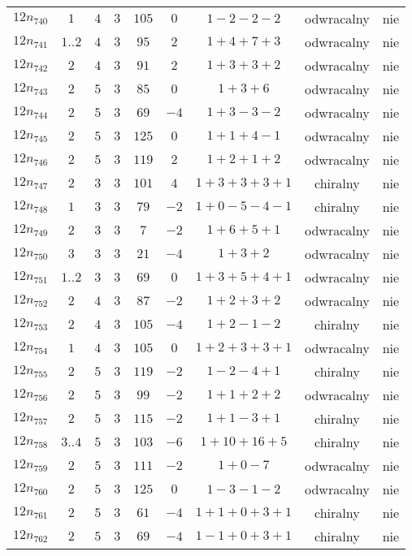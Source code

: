 \begin{longtable}{ccccccccc}
$12n_{740}$ & $1$ & $4$ & $3$ & $105$ & $0$ & $1-2-2-2$ & odwracalny & nie \\
$12n_{741}$ & $1..2$ & $4$ & $3$ & $95$ & $2$ & $1+4+7+3$ & odwracalny & nie \\
$12n_{742}$ & $2$ & $4$ & $3$ & $91$ & $2$ & $1+3+3+2$ & odwracalny & nie \\
$12n_{743}$ & $2$ & $5$ & $3$ & $85$ & $0$ & $1+3+6$ & odwracalny & nie \\
$12n_{744}$ & $2$ & $5$ & $3$ & $69$ & $-4$ & $1+3-3-2$ & odwracalny & nie \\
$12n_{745}$ & $2$ & $5$ & $3$ & $125$ & $0$ & $1+1+4-1$ & odwracalny & nie \\
$12n_{746}$ & $2$ & $5$ & $3$ & $119$ & $2$ & $1+2+1+2$ & odwracalny & nie \\
$12n_{747}$ & $2$ & $3$ & $3$ & $101$ & $4$ & $1+3+3+3+1$ & chiralny & nie \\
$12n_{748}$ & $1$ & $3$ & $3$ & $79$ & $-2$ & $1+0-5-4-1$ & chiralny & nie \\
$12n_{749}$ & $2$ & $3$ & $3$ & $7$ & $-2$ & $1+6+5+1$ & odwracalny & nie \\
$12n_{750}$ & $3$ & $3$ & $3$ & $21$ & $-4$ & $1+3+2$ & odwracalny & nie \\
$12n_{751}$ & $1..2$ & $3$ & $3$ & $69$ & $0$ & $1+3+5+4+1$ & odwracalny & nie \\
$12n_{752}$ & $2$ & $4$ & $3$ & $87$ & $-2$ & $1+2+3+2$ & odwracalny & nie \\
$12n_{753}$ & $2$ & $4$ & $3$ & $105$ & $-4$ & $1+2-1-2$ & chiralny & nie \\
$12n_{754}$ & $1$ & $4$ & $3$ & $105$ & $0$ & $1+2+3+3+1$ & odwracalny & nie \\
$12n_{755}$ & $2$ & $5$ & $3$ & $119$ & $-2$ & $1-2-4+1$ & chiralny & nie \\
$12n_{756}$ & $2$ & $5$ & $3$ & $99$ & $-2$ & $1+1+2+2$ & odwracalny & nie \\
$12n_{757}$ & $2$ & $5$ & $3$ & $115$ & $-2$ & $1+1-3+1$ & chiralny & nie \\
$12n_{758}$ & $3..4$ & $5$ & $3$ & $103$ & $-6$ & $1+10+16+5$ & chiralny & nie \\
$12n_{759}$ & $2$ & $5$ & $3$ & $111$ & $-2$ & $1+0-7$ & odwracalny & nie \\
$12n_{760}$ & $2$ & $5$ & $3$ & $125$ & $0$ & $1-3-1-2$ & odwracalny & nie \\
$12n_{761}$ & $2$ & $5$ & $3$ & $61$ & $-4$ & $1+1+0+3+1$ & chiralny & nie \\
$12n_{762}$ & $2$ & $5$ & $3$ & $69$ & $-4$ & $1-1+0+3+1$ & chiralny & nie \\

\end{longtable}
